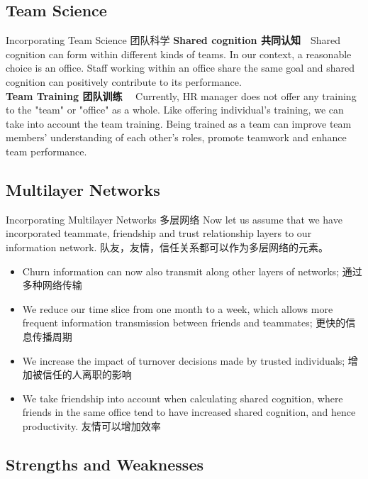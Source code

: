 \documentclass{beamer}
\begin{document}
\begin{CJK*}{UTF8}{gbsn}
\subsection{Team Science }
\begin{frame}{Incorporating Team Science 团队科学}
\textbf{Shared cognition 共同认知}\ \  Shared cognition can form within different kinds of teams. In our context, a reasonable choice is an office. Staff working within an office share the same goal and shared cognition can positively contribute to its performance.\\\vspace{0.5em}
\textbf{Team Training 团队训练} \ \ Currently, HR manager does not offer any training to the "team" or "office" as a whole. Like offering individual's training, we can take into account the team training. Being trained as a team can improve team members' understanding of each other's roles, promote teamwork and enhance team performance.
\end{frame}

\subsection{Multilayer Networks}
\begin{frame}{Incorporating Multilayer Networks 多层网络}
Now let us assume that we have incorporated teammate, friendship and trust relationship layers to our information network. 队友，友情，信任关系都可以作为多层网络的元素。

\begin{itemize}
\item Churn information can now also transmit along other layers of networks; 通过多种网络传输
\item We reduce our time slice from one month to a week, which allows more frequent information transmission between friends and teammates; 更快的信息传播周期
\item We increase the impact of turnover decisions made by trusted individuals; 增加被信任的人离职的影响
\item We take friendship into account when calculating shared cognition, where friends in the same office tend to have increased shared cognition, and hence productivity. 友情可以增加效率

\end{itemize}

\end{frame}

\subsection{Strengths and Weaknesses}


\end{CJK*}
\end{document}
